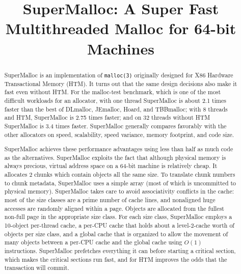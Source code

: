 \documentclass[natbib,sort&compress,10pt]{sigplanconf}
\begin{document}
\setlength{\pdfpageheight}{\paperheight}
\setlength{\pdfpagewidth}{\paperwidth}

\title{SuperMalloc: A Super Fast Multithreaded Malloc for 64-bit Machines}
\date{}
\exclusivelicense
\maketitle
\begin{abstract}

SuperMalloc is an implementation of \texttt{malloc(3)} originally
designed for X86 Hardware Transactional Memory (HTM)\@.  It turns out
that the same design decisions also make it fast even without HTM\@.
For the malloc-test benchmark, which is one of the most difficult
workloads for an allocator, with one thread SuperMalloc is about 2.1
times faster than the best of DLmalloc, JEmalloc, Hoard, and
TBBmalloc; with 8 threads and HTM, SuperMalloc is 2.75 times faster;
and on 32 threads without HTM SuperMalloc is 3.4 times faster.
SuperMalloc generally compares favorably with the other allocators on
speed, scalability, speed variance, memory footprint, and code size.

SuperMalloc achieves these performance advantages using less than half
as much code as the alternatives.  SuperMalloc exploits the fact that
although physical memory is always precious, virtual address space on
a 64-bit machine is relatively cheap.  It allocates
\unit{2}\mebi\byte{} chunks which contain objects all the same size.
To translate chunk numbers to chunk metadata, SuperMalloc uses a
simple array (most of which is uncommitted to physical memory).
SuperMalloc takes care to avoid associativity conflicts in the cache:
most of the size classes are a prime number of cache lines, and
nonaligned huge accesses are randomly aligned within a page.  Objects
are allocated from the fullest non-full page in the appropriate size
class.  For each size class, SuperMalloc employs a 10-object
per-thread cache, a per-CPU cache that holds about a level-2-cache
worth of objects per size class, and a global cache that is organized
to allow the movement of many objects between a per-CPU cache and the
global cache using $O(1)$ instructions.  SuperMalloc prefetches
everything it can before starting a critical section, which makes the
critical sections run fast, and for HTM improves the odds that the
transaction will commit.

\end{abstract}
\end{document}
